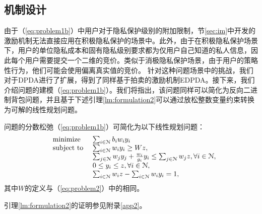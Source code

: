 	\subsection{机制设计}
	由于（\ref{eq:problem1b}）中用户对于隐私保护级别的附加限制，节\ref{sec:im}中开发的激励机制无法直接应用在积极隐私保护的场景中。此外，由于在积极隐私保护场景下，用户的单位隐私成本和固有隐私级别要求都为仅用户自己知道的私人信息，因此每个用户需要提交一个二维的竞价。类似于消极隐私保护场景，由于用户的策略性行为，他们可能会使用偏离真实值的竞价。 针对这种问题场景中的挑战，我们对于DPDA进行了扩展，得到了同样基于拍卖的激励机制EDPDA。接下来，我们介绍问题的建模（\ref{eq:problem1b}）。我们将指出，该问题同样可以简化为反向二进制背包问题，并且基于下述引理\ref{lm:formulation2}可以通过放松整数变量约束转换为可解的线性规划问题。
	\begin{lm}\label{lm:formulation2}
	问题的分数松弛（\ref{eq:problem1b}）可简化为以下线性规划问题：
		\begin{equation}%
		\hspace{-0.0cm}
		\begin{array}
		[c]{lll}%
		&{\text{minimize}}&~\sum_{i\in\N}b_iw_iy_i
		\\
		&\text{subject to}&~ \sum_{i\in\N}w_iy_i\geq Wz,\\
		&&~ \sum_{j\in\N}w_jy_j+\frac{w_i}{g_i}y_i\leq\sum_{j\in\N}w_jz, \forall i\in\N,\\
		&&~ 0\le y_i\le z, \forall i\in\N,\\
		&&~ \sum_{i\in\N}w_iz-\sum_{i\in\N}w_iy_i=1,
		\end{array}
		\label{eq:lpb}
		\end{equation}
		其中$W$的定义与（\ref{eq:problem2}）中的相同。
	\end{lm}
	引理\ref{lm:formulation2}的证明参见附录\ref{app2}。

